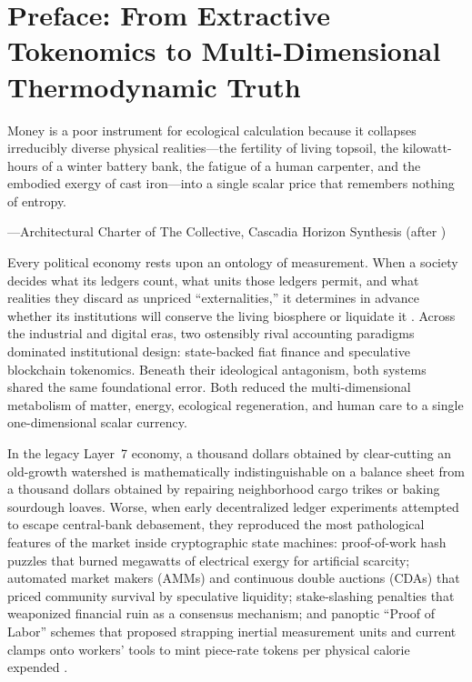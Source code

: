\chapter*{Preface: From Extractive Tokenomics to Multi-Dimensional Thermodynamic Truth}

\epigraph{Money is a poor instrument for ecological calculation because it collapses irreducibly diverse physical realities---the fertility of living topsoil, the kilowatt-hours of a winter battery bank, the fatigue of a human carpenter, and the embodied exergy of cast iron---into a single scalar price that remembers nothing of entropy.}{---Architectural Charter of The Collective, Cascadia Horizon Synthesis (after \textcite{neurath1919,georgescu1971})}

Every political economy rests upon an ontology of measurement. When a society decides what its ledgers count, what units those ledgers permit, and what realities they discard as unpriced ``externalities,'' it determines in advance whether its institutions will conserve the living biosphere or liquidate it \parencite{kapp1950social,polanyi1944}. Across the industrial and digital eras, two ostensibly rival accounting paradigms dominated institutional design: state-backed fiat finance and speculative blockchain tokenomics. Beneath their ideological antagonism, both systems shared the same foundational error. Both reduced the multi-dimensional metabolism of matter, energy, ecological regeneration, and human care to a single one-dimensional scalar currency.

In the legacy Layer~7 economy, a thousand dollars obtained by clear-cutting an old-growth watershed is mathematically indistinguishable on a balance sheet from a thousand dollars obtained by repairing neighborhood cargo trikes or baking sourdough loaves. Worse, when early decentralized ledger experiments attempted to escape central-bank debasement, they reproduced the most pathological features of the market inside cryptographic state machines: proof-of-work hash puzzles that burned megawatts of electrical exergy for artificial scarcity; automated market makers (AMMs) and continuous double auctions (CDAs) that priced community survival by speculative liquidity; stake-slashing penalties that weaponized financial ruin as a consensus mechanism; and panoptic ``Proof of Labor'' schemes that proposed strapping inertial measurement units and current clamps onto workers' tools to mint piece-rate tokens per physical calorie expended \parencite{zuboff2019,han2015}.

